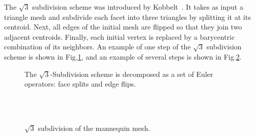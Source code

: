 \label{sec:subdivision_euler}

The $\sqrt{3}$ subdivision scheme was introduced by
Kobbelt~\cite{k-sqrt3-00}. It takes as input a triangle mesh and
subdivide each facet into three triangles by splitting it at its
centroid. Next, all edges of the initial mesh are flipped so that they
join two adjacent centroids. Finally, each initial vertex is replaced
by a barycentric combination of its neighbors. An example of one step
of the $\sqrt{3}$ subdivision scheme is shown in
Fig.\ref{fig:sqrt3_basic}, and an example of several steps is shown in
Fig.\ref{fig:sqrt3}.


\begin{figure}[htb]
    \caption{The $\sqrt{3}$-Subdivision scheme is decomposed as
             a set of Euler operators: face splits and edge flips.}
    \label{fig:sqrt3_basic}
\end{figure}

{ 

\scriptsize
\begin{verbatim}



\end{verbatim}
}


\begin{figure}[htb]
    \caption{$\sqrt{3}$ subdivision of the mannequin mesh.}
    \label{fig:sqrt3}
\end{figure}
